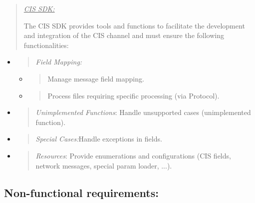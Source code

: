 \documentclass[12pt,a4paper]{report}
\begin{document}
\begin{quote}
\emph{\uline{CIS SDK:}}

The CIS SDK provides tools and functions to facilitate the development
and integration of the CIS channel and must ensure the following
functionalities:
\end{quote}

\begin{itemize}
\item
  \begin{quote}
  \emph{Field Mapping:}
  \end{quote}

  \begin{itemize}
  \item
    \begin{quote}
    Manage message field mapping.
    \end{quote}
  \item
    \begin{quote}
    Process files requiring specific processing (via Protocol).
    \end{quote}
  \end{itemize}
\item
  \begin{quote}
  \emph{Unimplemented Functions}: Handle unsupported cases
  (unimplemented function).
  \end{quote}
\item
  \begin{quote}
  \emph{Special Cases:}Handle exceptions in fields.
  \end{quote}
\item
  \begin{quote}
  \emph{Resources}: Provide enumerations and configurations (CIS fields,
  network messages, special param loader, ...).
  \end{quote}
\end{itemize}

\hypertarget{non-functional-requirements}{%
\subsection{\texorpdfstring{\textbf{Non-functional
requirements:}}{Non-functional requirements:}}\label{non-functional-requirements}}
\end{document}
